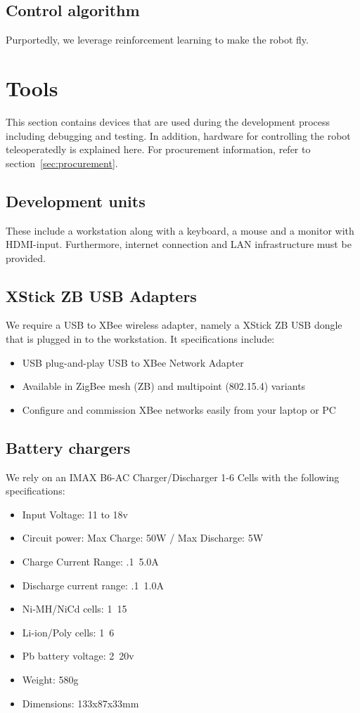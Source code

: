 \documentclass[a4paper, 10pt, twocolumn, titlepage]{article}
\begin{document}
\subsection{Control algorithm}
Purportedly, we leverage reinforcement learning to make the robot fly.

\section{Tools} \label{sec:tool}
This section contains devices that are used during the development process including debugging and testing.
In addition, hardware for controlling the robot teleoperatedly is explained here.
For procurement information, refer to section~\ref{sec:procurement}.

\subsection{Development units}
These include a workstation along with a keyboard, a mouse and a monitor with HDMI-input.
Furthermore, internet connection and LAN infrastructure must be provided.

\subsection{XStick ZB USB Adapters}
We require a USB to XBee wireless adapter, namely a XStick ZB USB dongle that is plugged in to the workstation.
It specifications include:
\begin{itemize}
\itemsep-1mm
  \item USB plug-and-play USB to XBee Network Adapter 
  \item Available in ZigBee mesh (ZB) and multipoint (802.15.4) variants
  \item Configure and commission XBee networks easily from your laptop or PC
\end{itemize}

\subsection{Battery chargers}
We rely on an IMAX B6-AC Charger/Discharger 1-6 Cells with the following specifications:
\begin{itemize}
\itemsep-1mm
  \item Input Voltage: 11 to 18v
  \item Circuit power: Max Charge: 50W / Max Discharge: 5W
  \item Charge Current Range: .1~5.0A
  \item Discharge current range: .1~1.0A
  \item Ni-MH/NiCd cells: 1~15
  \item Li-ion/Poly cells: 1~6
  \item Pb battery voltage: 2~20v
  \item Weight: 580g
  \item Dimensions: 133x87x33mm
\end{itemize}
\end{document}
